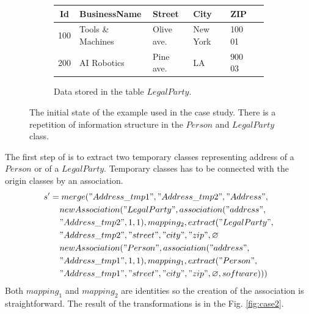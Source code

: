 \documentclass[runningheads]{comsis}
\begin{document}
\begin{figure}
\begin{subfigure}[b]{\textwidth}
\end{subfigure}
\begin{subfigure}[b]{\textwidth}
	\centering
	\begin{tabular}{| c | l | l | l | l | c |}
	 	\hline
		Id &  BusinessName & Street & City & ZIP \\ \hline  
		100 & Tools \& Machines & Olive ave. & New York & 100 01 \\ \hline
		200 & AI Robotics & Pine ave. & LA & 900 03  \\ \hline
	\end{tabular}
	\caption{Data stored in the table $LegalParty$.}
\end{subfigure}
	\caption{The initial state of the example used in the case study. There is a repetition of information structure in the $Person$ and $LegalParty$ class.}
	\label{fig:case1}
\end{figure}
The first  step of is to extract two temporary classes representing address of a $Person$ or of a $LegalParty$. Temporary classes has to be connected with the origin classes by an association.
\begin{align}
 s' &= merge("Address\_tmp1", "Address\_tmp2", "Address", \nonumber \\
& \;\;\;\;  newAssociation("LegalParty", association("address", \nonumber \\
& \;\;\;\; "Address\_tmp2", 1, 1), mapping_2, extract("LegalParty", \nonumber \\
& \;\;\;\;  "Address\_tmp2", "street", "city", "zip", \varnothing \nonumber  \\
& \;\;\;\; newAssociation("Person", association("address",\nonumber  \\
& \;\;\;\; "Address\_tmp1", 1, 1), mapping_1, extract("Person", \nonumber \\
& \;\;\;\; "Address\_tmp1", "street", "city", "zip", \varnothing, software)))
\end{align}
Both $mapping_1$ and $mapping_2$ are identities so the creation of the association is straightforward. The result of the transformations is in the Fig. \ref{fig:case2}. 
\end{document}
